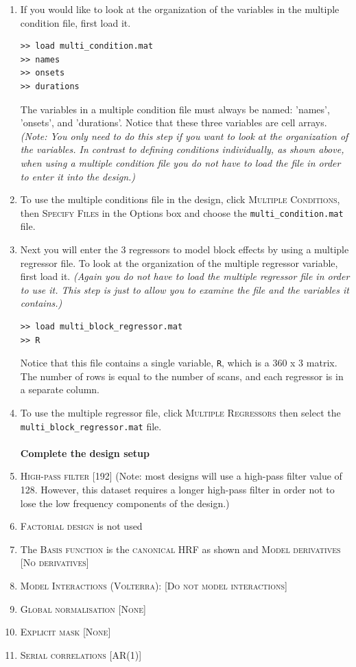 \begin{enumerate}
\textbf{Define conditions using multiple condition and multiple regressor files}
\item If you would like to look at the organization of the variables in the multiple condition file, first load it.
\begin{verbatim}
>> load multi_condition.mat
>> names
>> onsets
>> durations
\end{verbatim}
The variables in a multiple condition file must always be named: 'names', 'onsets', and 'durations'. Notice that these three variables are cell arrays.
\textit{(Note: You only need to do this step if you want to look at the organization of the variables. In contrast to defining conditions individually, as shown above, when using a multiple condition file you do not have to load the file in order to enter it into the design.)}\\
\item To use the multiple conditions file in the design, click \textsc{Multiple Conditions}, then \textsc{Specify Files} in the Options box and choose the \texttt{multi\_condition.mat} file.
\item Next you will enter the 3 regressors to model block effects by using a multiple regressor file. To look at the organization of the multiple regressor variable, first load it. \textit{(Again you do not have to load the multiple regressor file in order to use it. This step is just to allow you to examine the file and the variables it contains.)}
\begin{verbatim}
>> load multi_block_regressor.mat
>> R
\end{verbatim}
Notice that this file contains a single variable, \texttt{R}, which is a 360 x 3 matrix. The number of rows is equal to the number of scans, and each regressor is in a separate column.
\item To use the multiple regressor file, click \textsc{Multiple Regressors} then select the  \texttt{multi\_\-block\_\-regressor.mat} file.\\\\

\textbf{Complete the design setup}
\item \textsc{High-pass filter} [192] (Note: most designs will use a high-pass filter value of 128. However, this dataset requires a longer high-pass filter in order not to lose the low frequency components of the design.)
\item \textsc{Factorial design} is not used
\item The \textsc{Basis function} is the \textsc{canonical HRF} as shown and \textsc{Model derivatives} [\textsc{No derivatives}]
\item \textsc{Model Interactions (Volterra)}: [\textsc{Do not model interactions}]
\item \textsc{Global normalisation} [\textsc{None}]
\item \textsc{Explicit mask} [\textsc{None}]
\item \textsc{Serial correlations} [\textsc{AR(1)}]\\\\


\end{enumerate}
